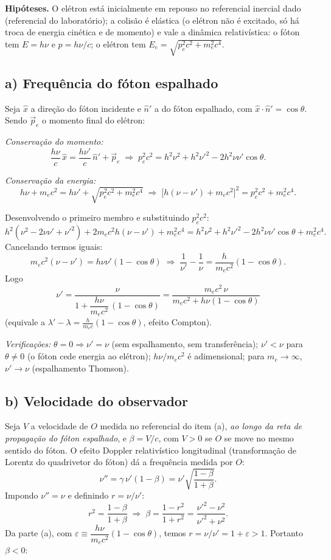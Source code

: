 \documentclass{article}%
\begin{document}
\textbf{Hipóteses.} O elétron está inicialmente em repouso no referencial inercial dado (referencial do laboratório); a colisão é elástica (o elétron não é excitado, só há troca de energia cinética e de momento) e vale a dinâmica relativística: o fóton tem $E=h\nu$ e $p=h\nu/c$; o elétron tem $E_e=\sqrt{p_e^2c^2+m_e^2c^4}$.

\subsection*{a) Frequência do fóton espalhado}

Seja $\hat{x}$ a direção do fóton incidente e $\hat{n}'$ a do fóton espalhado, com $\hat{x}\cdot\hat{n}'=\cos\theta$. Sendo $\vec p_e$ o momento final do elétron:

\textit{Conservação do momento:}
\[
\frac{h\nu}{c}\,\hat{x}=\frac{h\nu'}{c}\,\hat{n}'+\vec p_e
\;\Rightarrow\;
p_e^2c^2=h^2\nu^2+h^2\nu'^2-2h^2\nu\nu'\cos\theta .
\]

\textit{Conservação da energia:}
\[
h\nu+m_ec^2=h\nu'+\sqrt{p_e^2c^2+m_e^2c^4}
\;\Rightarrow\;
\bigl[h(\nu-\nu')+m_ec^2\bigr]^2=p_e^2c^2+m_e^2c^4 .
\]

Desenvolvendo o primeiro membro e substituindo $p_e^2c^2$:
\[
h^2(\nu^2-2\nu\nu'+\nu'^2)+2m_ec^2h(\nu-\nu')+m_e^2c^4
=h^2\nu^2+h^2\nu'^2-2h^2\nu\nu'\cos\theta+m_e^2c^4 .
\]
Cancelando termos iguais:
\[
m_ec^2(\nu-\nu')=h\nu\nu'(1-\cos\theta)
\;\Longrightarrow\;
\frac{1}{\nu'}-\frac{1}{\nu}=\frac{h}{m_ec^2}(1-\cos\theta).
\]
Logo
\[
\boxed{\;\nu'=\frac{\nu}{1+\dfrac{h\nu}{m_ec^2}\,(1-\cos\theta)}=\frac{m_ec^2\,\nu}{m_ec^2+h\nu(1-\cos\theta)}\;}
\]
(equivale a $\lambda'-\lambda=\frac{h}{m_ec}(1-\cos\theta)$, efeito Compton).

\textit{Verificações:} $\theta=0\Rightarrow\nu'=\nu$ (sem espalhamento, sem transferência); $\nu'<\nu$ para $\theta\neq0$ (o fóton cede energia ao elétron); $h\nu/m_ec^2$ é adimensional; para $m_e\to\infty$, $\nu'\to\nu$ (espalhamento Thomson).

\subsection*{b) Velocidade do observador}

Seja $V$ a velocidade de $O$ medida no referencial do item (a), \emph{ao longo da reta de propagação do fóton espalhado}, e $\beta=V/c$, com $V>0$ se $O$ se move no mesmo sentido do fóton. O efeito Doppler relativístico longitudinal (transformação de Lorentz do quadrivetor do fóton) dá a frequência medida por $O$:
\[
\nu''=\gamma\,\nu'(1-\beta)=\nu'\sqrt{\frac{1-\beta}{1+\beta}} .
\]
Impondo $\nu''=\nu$ e definindo $r=\nu/\nu'$:
\[
r^2=\frac{1-\beta}{1+\beta}\;\Rightarrow\;\beta=\frac{1-r^2}{1+r^2}=\frac{\nu'^2-\nu^2}{\nu'^2+\nu^2}.
\]
Da parte (a), com $\varepsilon\equiv\dfrac{h\nu}{m_ec^2}(1-\cos\theta)$, temos $r=\nu/\nu'=1+\varepsilon>1$. Portanto $\beta<0$:
\end{document}
